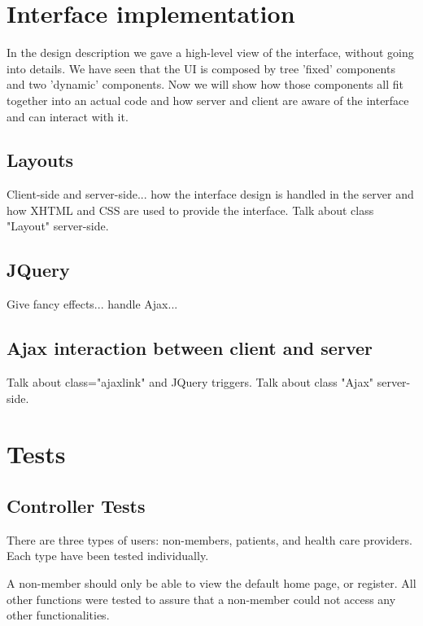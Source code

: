 \documentclass[12pt]{report}
\begin{document}
\begin{itemize}
\section{Interface implementation}
In the design description we gave a high-level view of the interface, without going into details. We have seen that the UI is composed by tree 'fixed' components and two 'dynamic' components. Now we will show how those components all fit together into an actual code and how server and client are aware of the interface and can interact with it.

\subsection{Layouts}
Client-side and server-side... how the interface design is handled in the server and how XHTML and CSS are used to provide the interface. Talk about class "Layout" server-side.
\subsection{JQuery}
Give fancy effects... handle Ajax... 
\subsection{Ajax interaction between client and server}
Talk about class="ajaxlink" and JQuery triggers. Talk about class "Ajax" server-side.

\section{Tests}

\subsection{Controller Tests}

There are three types of users: non-members, patients, and health care providers. Each type have been tested individually.

A non-member should only be able to view the default home page, or register. All other functions were tested to assure that a non-member could not access any other functionalities. 


\end{itemize}
\end{document}
